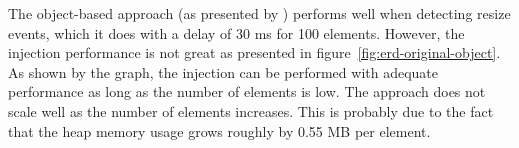 \documentclass{acm_proc_article-sp}
\begin{document}
    The object-based approach (as presented by \cite{backalley}) performs well when detecting resize events, which it does with a delay of 30 ms for 100 elements.
    However, the injection performance is not great as presented in figure~\ref{fig:erd-original-object}.
    As shown by the graph, the injection can be performed with adequate performance as long as the number of elements is low.
    The approach does not scale well as the number of elements increases.
    This is probably due to the fact that the heap memory usage grows roughly by 0.55 MB per element.

    \begin{figure}[h]
      \tiny
      \begin{center}
        \begin{minipage}[t]{.35\textwidth}
          \vspace{0pt}
          \centering
        \end{minipage}%

\end{center}
\end{figure}
\end{document}

